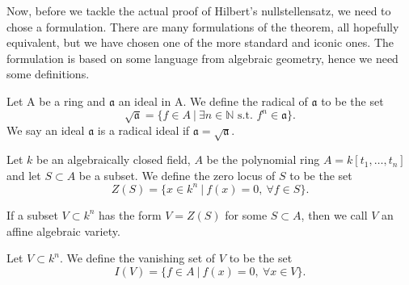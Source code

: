 Now, before we tackle the actual proof of Hilbert's nullstellensatz, 
we need to chose a formulation. 
There are many formulations of the theorem, 
all hopefully equivalent, 
but we have chosen one of the more standard and iconic ones. 
The formulation is based on some language from algebraic geometry, 
hence we need some definitions. 

\begin{definition}[Radical]
Let A be a ring and $\mathfrak{a}$ an ideal in A. 
We define the radical of $\mathfrak{a}$ to be the set
\begin{equation*}
    \sqrt{\mathfrak{a}} = \{ f\in A \ | \ \exists n \in \mathbb{N} \text{ s.t. } f^n \in \mathfrak{a} \}.
\end{equation*}
We say an ideal $\mathfrak{a}$ is a radical ideal if $\mathfrak{a}=\sqrt{\mathfrak{a}}$. 
\end{definition}

\begin{definition}
Let $k$ be an algebraically closed field, 
$A$ be the polynomial ring $A = k[t_1, \ldots, t_n]$ and let $S \subset A$ be a subset. 
We define the zero locus of $S$ to be the set 
\begin{equation*}
    Z(S) = \{ x\in k^n \ | \ f(x)=0, \ \forall f\in S\}.
\end{equation*}
\end{definition}
If a subset $V\subset k^n$ has the form $V=Z(S)$ for some $S\subset A$, 
then we call $V$ an affine algebraic variety.

\begin{definition}
Let $V\subset k^n$. We define the vanishing set of $V$ to be the set
\begin{equation*}
    I(V) = \{ f\in A \ | \ f(x)= 0, \ \forall x\in V\}.
\end{equation*}
\end{definition}